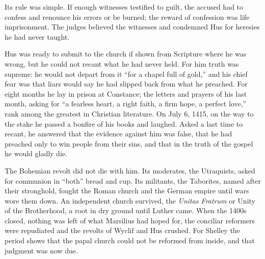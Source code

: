 Its rule was simple. If enough witnesses testified to guilt, the accused had to confess and renounce
his errors or be burned; the reward of confession was life imprisonment. The judges believed the
witnesses and condemned Hus for heresies he had never taught.

Hus was ready to submit to the church if shown from Scripture where he was wrong, but he could not
recant what he had never held. For him truth was supreme: he would not depart from it ``for a chapel
full of gold,'' and his chief fear was that liars would say he had slipped back from what he preached.
For eight months he lay in prison at Constance; the letters and prayers of his last month, asking
for ``a fearless heart, a right faith, a firm hope, a perfect love,'' rank among the greatest in
Christian literature. On July 6, 1415, on the way to the stake he passed a bonfire of his books and
laughed. Asked a last time to recant, he answered that the evidence against him was false, that he
had preached only to win people from their sins, and that in the truth of the gospel he would gladly
die.

The Bohemian revolt did not die with him. Its moderates, the Utraquists, asked for communion in
``both'' bread and cup. Its militants, the Taborites, named after their stronghold, fought the Roman
church and the German empire until wars wore them down. An independent church survived, the
\emph{Unitas Fratrum} or Unity of the Brotherhood, a root in dry ground until Luther came. When the 1400s closed, nothing was left of what Marsilius had hoped for, the conciliar reformers were
repudiated and the revolts of Wyclif and Hus crushed. For Shelley the period shows that the papal church could not be reformed from inside, and that judgment was now due.

\begin{keyfacts}
\end{keyfacts}
